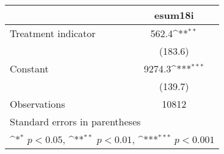 {
\def\sym#1{\ifmmode^{#1}\else\(^{#1}\)\fi}
\begin{tabular}{l*{1}{c}}
\hline\hline
                    &\multicolumn{1}{c}{esum18i}\\
\hline
Treatment indicator &       562.4\sym{**} \\
                    &     (183.6)         \\
[1em]
Constant            &      9274.3\sym{***}\\
                    &     (139.7)         \\
\hline
Observations        &       10812         \\
\hline\hline
\multicolumn{2}{l}{\footnotesize Standard errors in parentheses}\\
\multicolumn{2}{l}{\footnotesize \sym{*} \(p<0.05\), \sym{**} \(p<0.01\), \sym{***} \(p<0.001\)}\\
\end{tabular}
}
